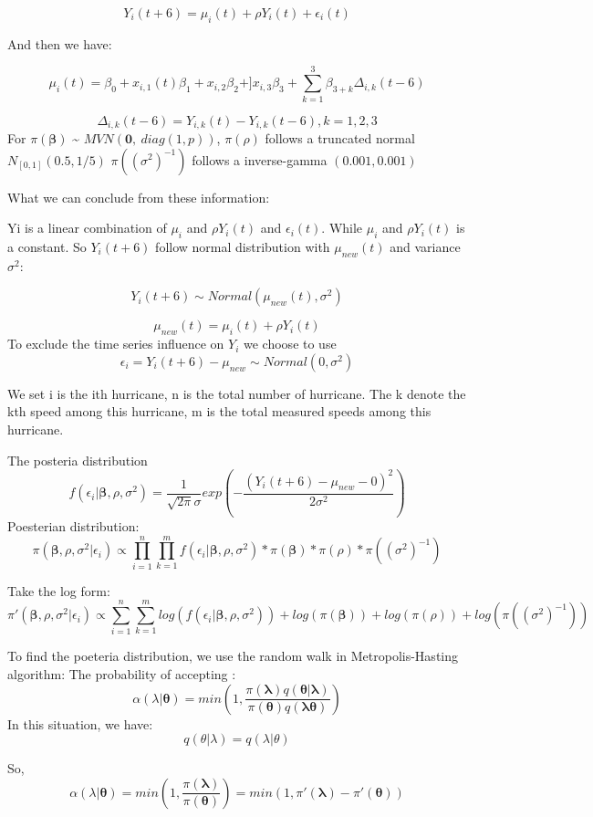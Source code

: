 \documentclass[]{article}
\begin{document}
\[Y_{i}(t+6) =  \mu_{i}(t) +\rho Y_{i}(t) + \epsilon_{i}(t)\]

And then we have:

\[\mu_{i}(t) =  \beta_{0}+x_{i,1}(t)\beta_{1} +
x_{i,2} \beta_{2} + ]
x_{i,3}\beta_{3} +
\sum_{k=1}^3\beta_{3+k}\Delta_{i,k}(t-6)\]

\[\Delta_{i,k}(t-6) = Y_{i,k}(t) -Y_{i,k}(t-6),k=1,2,3\] For
\(\pi(\boldsymbol{\beta})\) \textasciitilde{}
\(MVN(\mathbf 0,\ diag(1, p))\), \(\pi(\rho)\) follows a truncated
normal \(N_{[0,1]}(0.5, 1/5)\) \(\pi((\sigma^2)^{-1})\) follows a
inverse-gamma \((0.001, 0.001)\)

What we can conclude from these information:

Yi is a linear combination of \(\mu_i\) and \(\rho Y_{i}(t)\) and
\(\epsilon_{i}(t)\). While \(\mu_i\) and \(\rho Y_{i}(t)\) is a
constant. So \(Y_{i}(t+6)\) follow normal distribution with
\(\mu_{new}(t)\) and variance \(\sigma^2\):

\[Y_i(t+6)\sim Normal(\mu_{new}(t),\sigma^2)\]

\[\mu_{new}(t)=\mu_{i}(t)+\rho Y_{i}(t) \] To exclude the time series
influence on \(Y_i\) we choose to use
\[\epsilon_i=Y_i(t+6)-\mu_{new}\sim Normal(0,\sigma^2)\]

We set i is the ith hurricane, n is the total number of hurricane. The k
denote the kth speed among this hurricane, m is the total measured
speeds among this hurricane.

The posteria distribution
\[f(\epsilon_i|\boldsymbol\beta,\rho,\sigma^2 )=\frac{1}{\sqrt{2\pi}\sigma}exp(-\frac{(Y_i(t+6)-\mu_{new}-0)^2}{2\sigma^2})\]
Poesterian distribution:
\[\pi(\boldsymbol\beta,\rho,\sigma^2|\epsilon_i)\propto \prod_{i=1}^{n}\prod_{k=1}^{m}f(\epsilon_i|\boldsymbol\beta,\rho,\sigma^2 )*\pi(\boldsymbol{\beta})*\pi(\rho)*\pi((\sigma^2)^{-1})\]

Take the log form:
\[\pi'(\boldsymbol\beta,\rho,\sigma^2|\epsilon_i)\propto \sum_{i=1}^{n}\sum_{k=1}^{m}log(f(\epsilon_i|\boldsymbol\beta,\rho,\sigma^2 ))+log(\pi(\boldsymbol\beta))+log(\pi(\rho))+log(\pi((\sigma^2)^{-1}))\]

To find the poeteria distribution, we use the random walk in
Metropolis-Hasting algorithm: The probability of accepting :
\[\alpha(\lambda|\boldsymbol\theta)=min(1,\frac{\pi(\boldsymbol\lambda)q(\boldsymbol\theta|\boldsymbol\lambda)}{\pi(\boldsymbol\theta)q(\boldsymbol\lambda\boldsymbol\theta)})\]
In this situation, we have: \[q(\theta|\lambda)=q(\lambda|\theta)\]

So,
\[\alpha(\lambda|\boldsymbol\theta)=min(1,\frac{\pi(\boldsymbol\lambda)}{\pi(\boldsymbol\theta)})=min(1,\pi'(\boldsymbol\lambda)-\pi'(\boldsymbol\theta))\]
\end{document}

